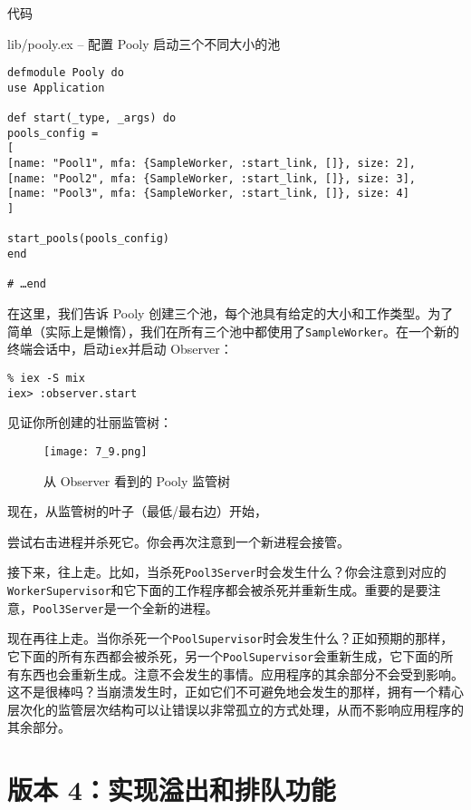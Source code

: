 代码\begin{code}{lib/pooly.ex -- 配置 Pooly 启动三个不同大小的池}

\begin{verbatim}
defmodule Pooly do
use Application

def start(_type, _args) do
pools_config =
[
[name: "Pool1", mfa: {SampleWorker, :start_link, []}, size: 2],
[name: "Pool2", mfa: {SampleWorker, :start_link, []}, size: 3],
[name: "Pool3", mfa: {SampleWorker, :start_link, []}, size: 4]
]

start_pools(pools_config)
end

# …end
\end{verbatim}
\end{code}

在这里，我们告诉 Pooly
创建三个池，每个池具有给定的大小和工作类型。为了简单（实际上是懒惰），我们在所有三个池中都使用了\texttt{SampleWorker}。在一个新的终端会话中，启动\texttt{iex}并启动
Observer：

\begin{code}{}
\begin{verbatim}
% iex -S mix
iex> :observer.start
\end{verbatim}
\end{code}

见证你所创建的壮丽监管树：

\begin{figure}[!ht]
    \centering
    \texttt{[image: 7\_9.png]}
    \caption{从 Observer 看到的 Pooly 监管树}
    \label{fig:7_9}
\end{figure}


现在，从监管树的叶子（最低/最右边）开始，

尝试右击进程并杀死它。你会再次注意到一个新进程会接管。

接下来，往上走。比如，当杀死\texttt{Pool3Server}时会发生什么？你会注意到对应的\texttt{WorkerSupervisor}和它下面的工作程序都会被杀死并重新生成。重要的是要注意，\texttt{Pool3Server}是一个全新的进程。

现在再往上走。当你杀死一个\texttt{PoolSupervisor}时会发生什么？正如预期的那样，它下面的所有东西都会被杀死，另一个\texttt{PoolSupervisor}会重新生成，它下面的所有东西也会重新生成。注意不会发生的事情。应用程序的其余部分不会受到影响。这不是很棒吗？当崩溃发生时，正如它们不可避免地会发生的那样，拥有一个精心层次化的监管层次结构可以让错误以非常孤立的方式处理，从而不影响应用程序的其余部分。

\section{版本 4：实现溢出和排队功能}

